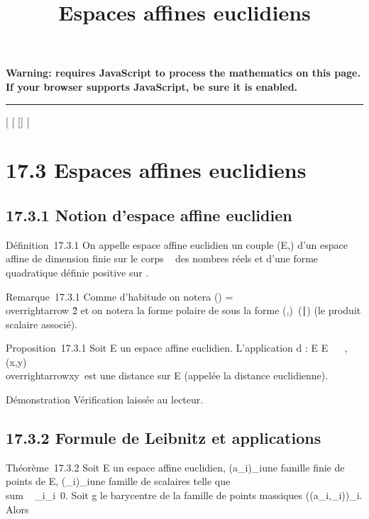 \documentclass[]{article}
\title{Espaces affines euclidiens}
\author{}
\date{}
\begin{document}
\maketitle

\textbf{Warning: 
requires JavaScript to process the mathematics on this page.\\ If your
browser supports JavaScript, be sure it is enabled.}

\begin{center}\rule{3in}{0.4pt}\end{center}

[
[
[]
[

\section{17.3 Espaces affines euclidiens}

\subsection{17.3.1 Notion d'espace affine euclidien}

Définition~17.3.1 On appelle espace affine euclidien un couple (E,\Phi)
d'un espace affine de dimension finie sur le corps ~ des nombres réels
et d'une forme quadratique définie positive \Phi sur
\overrightarrowE.

Remarque~17.3.1 Comme d'habitude on notera
\Phi(\overrightarrow\xi)
=\\overrightarrow
\xi\^2 et on notera la forme polaire
de \Phi sous la forme
(\overrightarrow\xi,\overrightarrow\eta)\mapsto~(\overrightarrow\xi\mathrel∣\overrightarrow\eta)
(le produit scalaire associé).

Proposition~17.3.1 Soit E un espace affine euclidien. L'application d :
E \times E \rightarrow~ ~,
(x,y)\mapsto~\\overrightarrowxy\
est une distance sur E (appelée la distance euclidienne).

Démonstration Vérification laissée au lecteur.

\subsection{17.3.2 Formule de Leibnitz et applications}

Théorème~17.3.2 Soit E un espace affine euclidien,
(a_i)_i\inI une famille finie de points de E,
(\lambda_i)_i\inI une famille de scalaires telle que
\\sum ~
_i\inI\lambda_i\neq~0. Soit g le
barycentre de la famille de points massiques \left
((a_i,\lambda_i)\right )_i\inI. Alors
\end{document}

